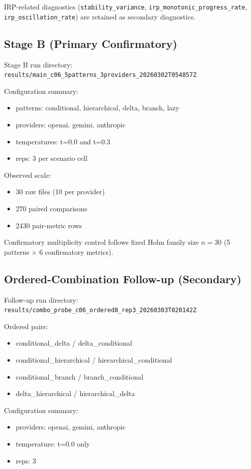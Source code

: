 \documentclass[11pt,a4paper]{article}
\begin{document}
IRP-related diagnostics (\texttt{stability\_variance}, \texttt{irp\_monotonic\_progress\_rate}, \texttt{irp\_oscillation\_rate}) are retained as secondary diagnostics.

\subsection{Stage B (Primary Confirmatory)}

Stage B run directory:
\texttt{results/main\_c06\_5patterns\_3providers\_20260302T054857Z}

Configuration summary:
\begin{itemize}
  \item patterns: conditional, hierarchical, delta, branch, lazy
  \item providers: openai, gemini, anthropic
  \item temperatures: t=0.0 and t=0.3
  \item reps: 3 per scenario cell
\end{itemize}

Observed scale:
\begin{itemize}
  \item 30 raw files (10 per provider)
  \item 270 paired comparisons
  \item 2430 pair-metric rows
\end{itemize}

Confirmatory multiplicity control follows fixed Holm family size $n=30$ (5 patterns $\times$ 6 confirmatory metrics).

\subsection{Ordered-Combination Follow-up (Secondary)}

Follow-up run directory:
\texttt{results/combo\_probe\_c06\_ordered8\_rep3\_20260303T020142Z}

Ordered pairs:
\begin{itemize}
  \item conditional\_delta / delta\_conditional
  \item conditional\_hierarchical / hierarchical\_conditional
  \item conditional\_branch / branch\_conditional
  \item delta\_hierarchical / hierarchical\_delta
\end{itemize}

Configuration summary:
\begin{itemize}
  \item providers: openai, gemini, anthropic
  \item temperature: t=0.0 only
  \item reps: 3
\end{itemize}
\end{document}
